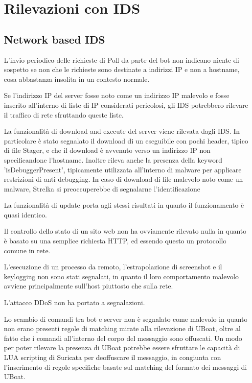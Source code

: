 \section{Rilevazioni con IDS}
\subsection{Network based IDS}
L'invio periodico delle richieste di Poll da parte del bot non indicano niente  di sospetto se non che le richieste sono destinate a indirizzi IP e non a hostname, cosa abbastanza insolita in un contesto normale.

Se l'indirizzo IP del server fosse noto come un indirizzo IP malevolo e fosse inserito all'interno di liste di IP considerati pericolosi, gli IDS  potrebbero rilevare il traffico di rete sfruttando queste liste. 

\medskip

La funzionalità di download and execute del server viene rilevata dagli IDS. In particolare è stato segnalato il download di un eseguibile con pochi header, tipico di file Stager, e che il download è avvenuto verso un indirizzo IP non specificandone l'hostname. Inoltre rileva anche la presenza della keyword 'isDebuggerPresent', tipicamente utilizzata all'interno di malware per applicare restrizioni di anti-debugging.
In caso di download di file malevolo noto come un malware, Strelka si preoccuperebbe di segnalarne l'identificazione

La funzionalità di update porta agli stessi risultati in quanto il funzionamento è quasi identico.

\medskip

Il controllo dello stato di un sito web non ha ovviamente rilevato nulla in quanto è basato su una semplice richiesta HTTP, ed essendo questo un protocollo comune in rete.

\medskip
L'esecuzione di un processo da remoto, l'estrapolazione di screenshot e il keylogging non sono stati segnalati, in quanto il loro comportamento malevolo avviene principalmente  sull'host piuttosto che sulla rete.

\medskip

L'attacco DDoS non ha portato a segnalazioni.

\medskip
Lo scambio di comandi tra bot e server non è segnalato come malevolo in quanto non erano presenti regole di matching mirate alla rilevazione di UBoat, oltre al fatto che i comandi all'interno del corpo del messaggio sono offuscati.
Un modo per poter rilevare la presenza di UBoat potrebbe essere sfruttare le capacità di LUA scripting di Suricata per deoffuscare il messaggio, in congiunta con l'inserimento di regole specifiche basate sul matching del formato dei messaggi di UBoat.

